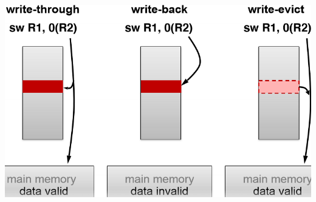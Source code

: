 \documentclass[letterpaper,12pt]{article}
\begin{document}
\includegraphics*[scale = 0.8]{./Image/Writes that hits.png}
\end{document}

